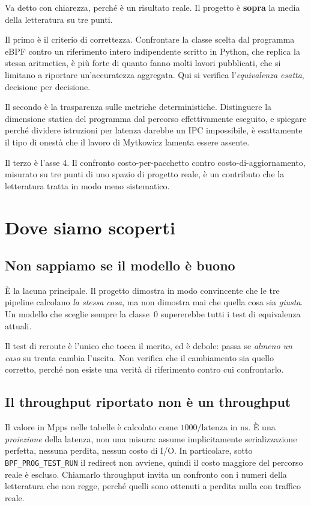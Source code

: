 \documentclass[11pt,a4paper,oneside]{report}
\begin{document}
Va detto con chiarezza, perché è un risultato reale. Il progetto è
\textbf{sopra} la media della letteratura su tre punti.

Il primo è il criterio di correttezza. Confrontare la classe scelta
dal programma eBPF contro un riferimento intero indipendente scritto
in Python, che replica la stessa aritmetica, è più forte di quanto
fanno molti lavori pubblicati, che si limitano a riportare
un'accuratezza aggregata. Qui si verifica l'\emph{equivalenza
esatta}, decisione per decisione.

Il secondo è la trasparenza sulle metriche deterministiche. Distinguere
la dimensione statica del programma dal percorso effettivamente
eseguito, e spiegare perché dividere istruzioni per latenza darebbe un
IPC impossibile, è esattamente il tipo di onestà che il lavoro di
Mytkowicz lamenta essere assente.

Il terzo è l'asse 4. Il confronto costo-per-pacchetto contro
costo-di-aggiornamento, misurato su tre punti di uno spazio di
progetto reale, è un contributo che la letteratura tratta in modo meno
sistematico.

\section{Dove siamo scoperti}

\subsection{Non sappiamo se il modello è buono}

È la lacuna principale. Il progetto dimostra in modo convincente che
le tre pipeline calcolano \emph{la stessa cosa}, ma non dimostra mai
che quella cosa sia \emph{giusta}. Un modello che sceglie sempre la
classe~0 supererebbe tutti i test di equivalenza attuali.

Il test di reroute è l'unico che tocca il merito, ed è debole: passa
se \emph{almeno un caso} su trenta cambia l'uscita. Non verifica che il
cambiamento sia quello corretto, perché non esiste una verità di
riferimento contro cui confrontarlo.

\subsection{Il throughput riportato non è un throughput}

Il valore in Mpps nelle tabelle è calcolato come $1000/\text{latenza in
ns}$. È una \emph{proiezione} della latenza, non una misura: assume
implicitamente serializzazione perfetta, nessuna perdita, nessun costo
di I/O. In particolare, sotto \texttt{BPF\_PROG\_TEST\_RUN} il redirect
non avviene, quindi il costo maggiore del percorso reale è escluso.
Chiamarlo throughput invita un confronto con i numeri della
letteratura che non regge, perché quelli sono ottenuti a perdita nulla
con traffico reale.
\end{document}
